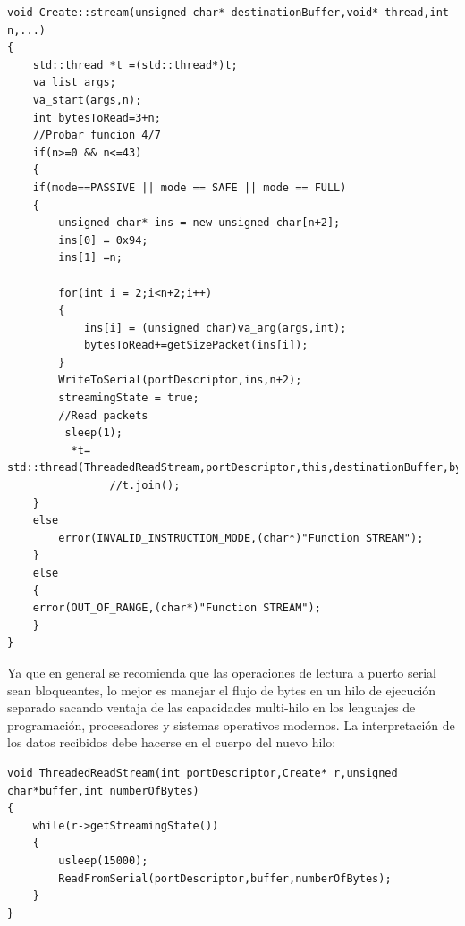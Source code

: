 \documentclass[letterpaper,openright,12pt]{book}
\begin{document}
\begin{lstlisting}
void Create::stream(unsigned char* destinationBuffer,void* thread,int n,...)
{
	std::thread *t =(std::thread*)t;
	va_list args;
	va_start(args,n);
	int bytesToRead=3+n;
	//Probar funcion 4/7
	if(n>=0 && n<=43)
	{
	if(mode==PASSIVE || mode == SAFE || mode == FULL)
	{
		unsigned char* ins = new unsigned char[n+2];
		ins[0] = 0x94;
		ins[1] =n;
		
		for(int i = 2;i<n+2;i++)
		{
			ins[i] = (unsigned char)va_arg(args,int);
			bytesToRead+=getSizePacket(ins[i]);
		}
		WriteToSerial(portDescriptor,ins,n+2);
		streamingState = true;
		//Read packets
		 sleep(1);
		  *t= std::thread(ThreadedReadStream,portDescriptor,this,destinationBuffer,bytesToRead);
				//t.join();
	}
	else
		error(INVALID_INSTRUCTION_MODE,(char*)"Function STREAM");
	}
	else
	{
	error(OUT_OF_RANGE,(char*)"Function STREAM");
	}
}

\end{lstlisting}

Ya que en general se recomienda que las operaciones de lectura a puerto serial sean bloqueantes, lo mejor es manejar el flujo de bytes en un hilo de ejecución separado sacando ventaja de las capacidades multi-hilo en los lenguajes de programación, procesadores y sistemas operativos modernos. La interpretación de los datos recibidos debe hacerse en el cuerpo del nuevo hilo:

\begin{lstlisting}
void ThreadedReadStream(int portDescriptor,Create* r,unsigned char*buffer,int numberOfBytes)
{
	while(r->getStreamingState())
	{
		usleep(15000);
		ReadFromSerial(portDescriptor,buffer,numberOfBytes);
	}
}


\end{lstlisting}
\end{document}
